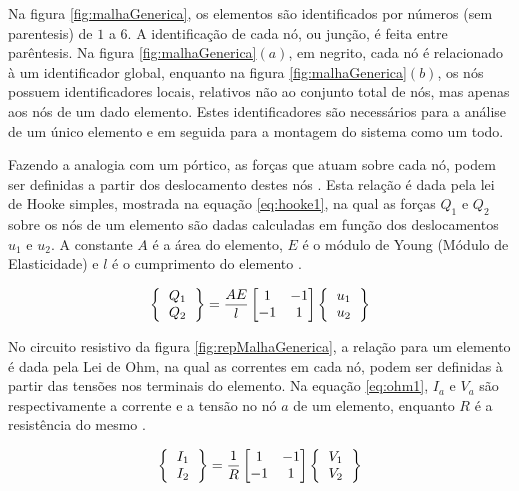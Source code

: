 \documentclass[
    12pt,               %
    openright,          %
    oneside,
    a4paper,            %
    english,            %
    french,             %
    spanish,            %
    brazil              %
    ]{abntex2}
\begin{document}
Na figura \ref{fig:malhaGenerica}, os elementos são identificados por números (sem parentesis) de $1$ a $6$. A identificação de cada nó, ou junção, é feita entre parêntesis. Na figura \ref{fig:malhaGenerica}$(a)$, em negrito, cada nó é relacionado à um identificador global, enquanto na figura \ref{fig:malhaGenerica}$(b)$, os nós possuem identificadores locais, relativos não ao conjunto total de nós, mas apenas aos nós de um dado elemento. Estes identificadores são necessários para a análise de um único elemento e em seguida para a montagem do sistema como um todo.

Fazendo a analogia com um pórtico, as forças que atuam sobre cada nó, podem ser definidas a partir dos deslocamento destes nós \cite[p. 3]{zien}. Esta relação é dada pela lei de Hooke simples, mostrada na equação \ref{eq:hooke1}, na qual as forças $Q_1$ e $Q_2$ sobre os nós de um elemento são dadas calculadas em função dos deslocamentos $u_1$ e $u_2$. A constante $A$ é a área do elemento, $E$ é o módulo de Young (Módulo de Elasticidade) e $l$ é o cumprimento do elemento \cite[p. 13]{desai}.

 \begin{equation}
    \label{eq:hooke1}
	\left \{
     \begin{tabular}{c}
         $Q_1$ \\
         $Q_2$
     \end{tabular}       
     \right \} =
     	\frac{AE}{l}
        \begin{bmatrix}
            1 & -1 \\
            -1 & 1
        \end{bmatrix}      
	\left \{
     \begin{tabular}{c}
         $u_1$ \\
         $u_2$
     \end{tabular}       
     \right \}            
 \end{equation}


No circuito resistivo da figura \ref{fig:repMalhaGenerica}, a relação para um elemento é dada pela Lei de Ohm, na qual as correntes em cada nó, podem ser definidas à partir das tensões nos terminais do elemento. Na equação \ref{eq:ohm1}, $I_a$ e $V_a$ são respectivamente a corrente e a tensão no nó $a$ de um elemento, enquanto $R$ é a resistência do mesmo \cite[p. 7]{zien}.

 \begin{equation}
    \label{eq:ohm1}
	\left \{
     \begin{tabular}{c}
         $I_1$ \\
         $I_2$
     \end{tabular}       
     \right \} =
     	\frac{1}{R}
        \begin{bmatrix}
            1 & -1 \\
            -1 & 1
        \end{bmatrix}      
	\left \{
     \begin{tabular}{c}
         $V_1$ \\
         $V_2$
     \end{tabular}       
     \right \}            
 \end{equation}
 
\end{document}
